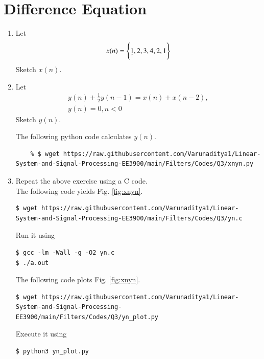 \documentclass[journal,12pt,twocolumn]{IEEEtran}
\renewcommand\thesection{\arabic{section}}
\begin{document}
\section{Difference Equation}
\begin{enumerate}[label=\thesection.\arabic*,ref=\thesection.\theenumi]
\item Let
\begin{equation}
x(n) = \left\{\underset{\uparrow}{1},2,3,4,2,1\right\}
\end{equation}
Sketch $x(n)$.
\item Let
\begin{multline}
\label{eq:iir_filter}
y(n) + \frac{1}{2}y(n-1) = x(n) + x(n-2), 
\\
y(n) = 0, n < 0
\end{multline}
Sketch $y(n)$.

\solution The following python code calculates $y(n)$.
\begin{lstlisting}
	% $ wget https://raw.githubusercontent.com/Varunaditya1/Linear-System-and-Signal-Processing-EE3900/main/Filters/Codes/Q3/xnyn.py
	\end{lstlisting}
\item Repeat the above exercise using a C code.
\\
\solution The following code yields Fig. \ref{fig:xnyn}.

\begin{lstlisting}
$ wget https://raw.githubusercontent.com/Varunaditya1/Linear-System-and-Signal-Processing-EE3900/main/Filters/Codes/Q3/yn.c
\end{lstlisting}
Run it using
\begin{lstlisting}
$ gcc -lm -Wall -g -O2 yn.c
$ ./a.out
\end{lstlisting}
The following code plots Fig. \eqref{fig:xnyn}.
\begin{lstlisting}
$ wget https://raw.githubusercontent.com/Varunaditya1/Linear-System-and-Signal-Processing-EE3900/main/Filters/Codes/Q3/yn_plot.py
\end{lstlisting}
Execute it using
\begin{lstlisting}
$ python3 yn_plot.py
\end{lstlisting}


\end{enumerate}
\end{document}
